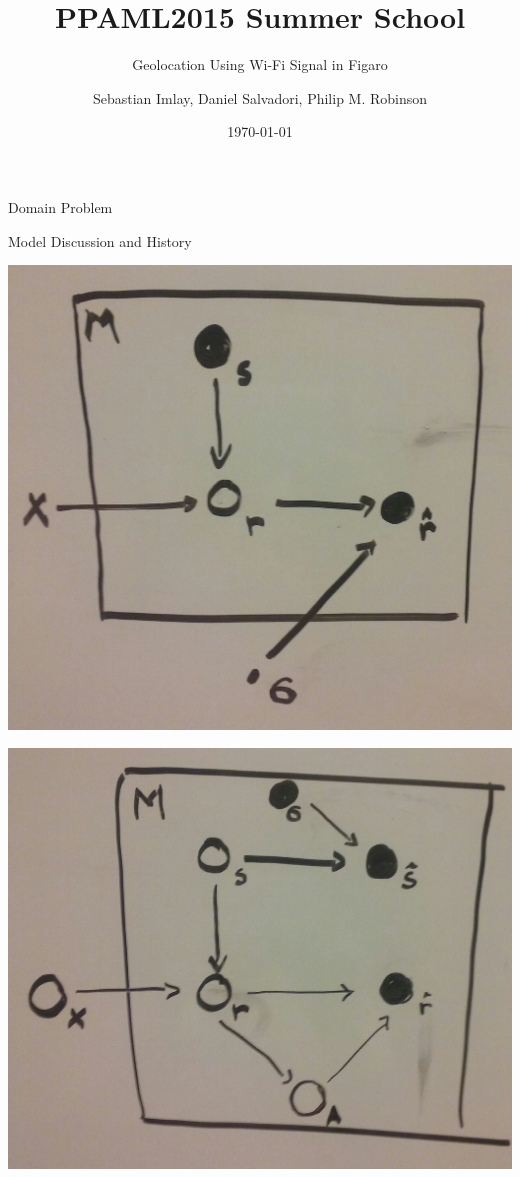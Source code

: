 \documentclass[11pt]{beamer}
\begin{document}
\title{PPAML2015 Summer School}

\subtitle{Geolocation Using Wi-Fi Signal in Figaro}

\author{Sebastian Imlay, Daniel Salvadori, Philip M. Robinson}


\date{\today}

\begin{frame}
  \titlepage
\end{frame}


\begin{frame}{Domain Problem}

\end{frame}

\begin{frame}{Model Discussion and History}
\begin{center}
\begin{multicols}{3}
\includegraphics[height=0.3\textheight]{pictures/1plate.jpg}

\columnbreak
\includegraphics[height=0.3\textheight]{pictures/2plate.jpg}


\end{multicols}
\end{center}
\end{frame}
\end{document}
